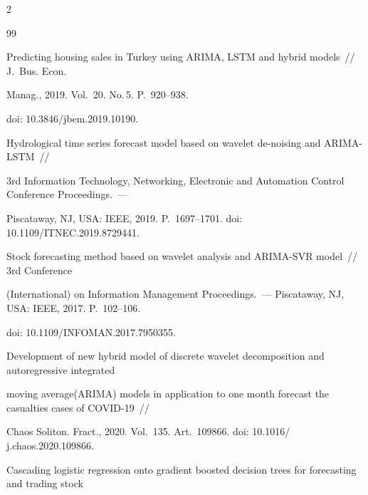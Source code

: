 \begin{multicols}{2}
{{\begin{thebibliography}{99}

Predicting housing sales in Turkey using ARIMA, LSTM and hybrid models~//  J.~Bus. Econ. 

Manag., 2019. Vol.~20. No.\,5. P.~920--938.

doi: 10.3846/jbem.2019.10190.





 Hydrological time series forecast model based on wavelet de-noising and ARIMA-LSTM~//  

 3rd Information Technology, Networking, Electronic and Automation Control Conference Proceedings.~--- 

 Piscataway, NJ, USA: IEEE, 2019. P.~1697--1701. doi: 10.1109/\linebreak ITNEC.2019.8729441.











Stock forecasting method based on wavelet analysis and ARIMA-SVR model~// 3rd Conference 

(International) on Information Management Proceedings.~--- Piscataway, NJ, USA: IEEE, 2017. P.~102--106. 

doi: 10.1109/\mbox{INFOMAN}.2017.7950355.





Development of new hybrid model of discrete wavelet decomposition and autoregressive integrated 

moving average\linebreak (\mbox{ARIMA}) models in application to one month forecast the casualties cases of COVID-19~// 

Chaos Soliton. Fract., 2020. Vol.~135. Art.~109866.  doi: 10.1016/ j.chaos.2020.109866.





Cascading logistic regression onto gradient boosted decision trees for forecasting and trading stock 


\end{thebibliography}}}
\end{multicols}
